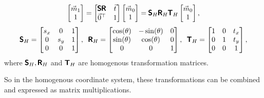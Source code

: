 \begin{equation}
    \begin{bmatrix} \vec{m}_1 \\ 1 \end{bmatrix} = 
    \begin{bmatrix}
        \pmb{\mathsf{S}} \pmb{\mathsf{R}} & \vec{t} \\
        \vec{0}^\top & 1
    \end{bmatrix}
    \begin{bmatrix} \vec{m}_0 \\ 1 \end{bmatrix} = 
    \pmb{\mathsf{S}}_H \pmb{\mathsf{R}}_H \pmb{\mathsf{T}}_H
    \begin{bmatrix} \vec{m}_0 \\ 1 \end{bmatrix},
\end{equation}
\begin{equation}
    \pmb{\mathsf{S}}_H = \begin{bmatrix} s_x & 0 & 1\\ 0 & s_y & 1 \\ 0 & 0 & 1\end{bmatrix}, \;\;
    \pmb{\mathsf{R}}_H = \begin{bmatrix} \cos(\theta) & -\sin(\theta) & 0 \\ \sin(\theta) & \cos(\theta) & 0 \\ 0 & 0 & 1 \end{bmatrix}, \;\;
    \pmb{\mathsf{T}}_H = \begin{bmatrix} 1 & 0 & t_x\\ 0 & 1 & t_y \\ 0 & 0 & 1 \end{bmatrix} ,
\end{equation}
where $\pmb{\mathsf{S}}_H, \pmb{\mathsf{R}}_H$ and $\pmb{\mathsf{T}}_H$ are homogenous transformation matrices.

So in the homogenous coordinate system, these transformations can be combined and expressed as matrix multiplications.




